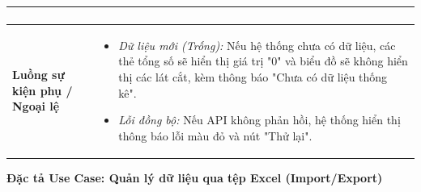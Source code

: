 \documentclass[12pt,a4paper]{article}
\begin{document}
\begin{center}
\begin{tabular}{|p{4cm}|p{10cm}|}
\begin{enumerate}
\end{enumerate} \\ \hline
\textbf{Luồng sự kiện phụ / Ngoại lệ} & 
\begin{itemize}
    \item \textit{Dữ liệu mới (Trống):} Nếu hệ thống chưa có dữ liệu, các thẻ tổng số sẽ hiển thị giá trị "0" và biểu đồ sẽ không hiển thị các lát cắt, kèm thông báo "Chưa có dữ liệu thống kê".
    \item \textit{Lỗi đồng bộ:} Nếu API không phản hồi, hệ thống hiển thị thông báo lỗi màu đỏ và nút "Thử lại".
\end{itemize} \\ \hline
\end{tabular}
\end{center}




\vspace{0.5cm}
\textbf{Đặc tả Use Case: Quản lý dữ liệu qua tệp Excel (Import/Export)}
\end{document}
